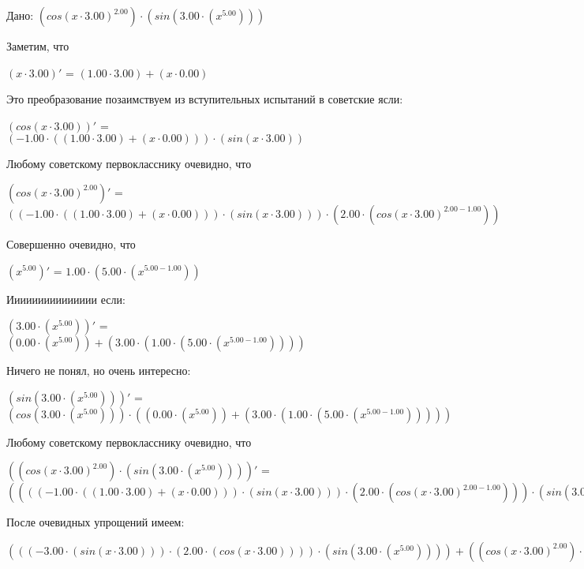 \documentclass{article}
\begin{document}
Дано: $({cos(x \cdot 3.00)}^{2.00}) \cdot (sin(3.00 \cdot ({x}^{5.00})))$

Заметим, что

$(x \cdot 3.00)'$ = $(1.00 \cdot 3.00) + (x \cdot 0.00)$



Это преобразование позаимствуем из вступительных испытаний в советские ясли:

$(cos(x \cdot 3.00))'$ = $(-1.00 \cdot ((1.00 \cdot 3.00) + (x \cdot 0.00))) \cdot (sin(x \cdot 3.00))$



Любому советскому первокласснику очевидно, что

$({cos(x \cdot 3.00)}^{2.00})'$ = $((-1.00 \cdot ((1.00 \cdot 3.00) + (x \cdot 0.00))) \cdot (sin(x \cdot 3.00))) \cdot (2.00 \cdot ({cos(x \cdot 3.00)}^{2.00 - 1.00}))$



Совершенно очевидно, что

$({x}^{5.00})'$ = $1.00 \cdot (5.00 \cdot ({x}^{5.00 - 1.00}))$



Иииииииииииииии если:

$(3.00 \cdot ({x}^{5.00}))'$ = $(0.00 \cdot ({x}^{5.00})) + (3.00 \cdot (1.00 \cdot (5.00 \cdot ({x}^{5.00 - 1.00}))))$



Ничего не понял, но очень интересно:

$(sin(3.00 \cdot ({x}^{5.00})))'$ = $(cos(3.00 \cdot ({x}^{5.00}))) \cdot ((0.00 \cdot ({x}^{5.00})) + (3.00 \cdot (1.00 \cdot (5.00 \cdot ({x}^{5.00 - 1.00})))))$



Любому советскому первокласснику очевидно, что

$(({cos(x \cdot 3.00)}^{2.00}) \cdot (sin(3.00 \cdot ({x}^{5.00}))))'$ = $((((-1.00 \cdot ((1.00 \cdot 3.00) + (x \cdot 0.00))) \cdot (sin(x \cdot 3.00))) \cdot (2.00 \cdot ({cos(x \cdot 3.00)}^{2.00 - 1.00}))) \cdot (sin(3.00 \cdot ({x}^{5.00})))) + (({cos(x \cdot 3.00)}^{2.00}) \cdot ((cos(3.00 \cdot ({x}^{5.00}))) \cdot ((0.00 \cdot ({x}^{5.00})) + (3.00 \cdot (1.00 \cdot (5.00 \cdot ({x}^{5.00 - 1.00})))))))$

После очевидных упрощений имеем:

$(((-3.00 \cdot (sin(x \cdot 3.00))) \cdot (2.00 \cdot (cos(x \cdot 3.00)))) \cdot (sin(3.00 \cdot ({x}^{5.00})))) + (({cos(x \cdot 3.00)}^{2.00}) \cdot ((cos(3.00 \cdot ({x}^{5.00}))) \cdot (3.00 \cdot (5.00 \cdot ({x}^{4.00})))))$
\end{document}
